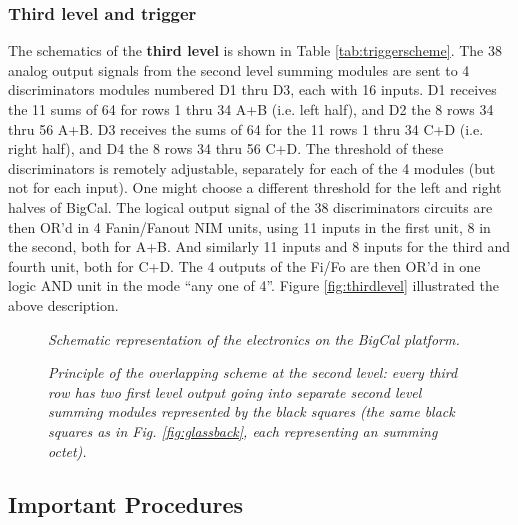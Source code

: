 \documentclass{chowto}
\begin{document}
\subsubsection{Third level and trigger}

The schematics of the {\bf third level} is 
shown in Table \ref{tab:triggerscheme}. The 38 analog output signals from the second level summing
modules are sent to 4 discriminators modules numbered D1 thru D3, each with 16 inputs. D1 
receives the 11 sums of 64 for
rows 1 thru 34 A+B (i.e. left half), and D2 the 8 rows 34 thru 56 A+B. D3 receives the sums of 
64 for the 11
rows 1 thru 34 C+D (i.e. right half), and D4 the  8 rows 34 thru 56 C+D. The threshold of these 
discriminators is remotely adjustable, separately for each of the 4 modules (but not for each input).
One might choose a different threshold for the left and right halves of BigCal.
The logical output signal of the 38 discriminators circuits are then OR'd in 4 Fanin/Fanout 
NIM units, using 11 inputs in the first unit, 8 in the second, both for A+B. And similarly
11 inputs and 8 inputs for the third and fourth unit, both for C+D. The 4 outputs of the Fi/Fo 
are then OR'd in one logic AND unit in the mode
``any one of 4''.  Figure \ref{fig:thirdlevel} illustrated the above description.

\begin{figure}[h]
\begin{center}
\caption[]{\it{Schematic representation of the electronics on the BigCal 
platform. }}
\label{fig:blockdiagram}
\end{center}
\end{figure}

\begin{figure}[h]
\begin{center}
\caption[]{\it{Principle of the overlapping scheme at the second level: every 
third row has two first level output going into separate second level 
summing modules
represented by the black squares (the same black squares as in 
Fig. \ref{fig:glassback}, each representing an summing octet). }}
\label{fig:idea}
\end{center}
\end{figure}


\subsection{Important Procedures}
\end{document}
